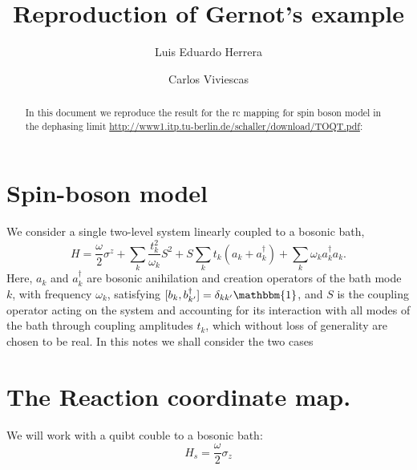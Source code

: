 \documentclass[reprint,aps,onecolumn,pra,notitlepage,nofootinbib]{revtex4-1}
\theoremstyle{definition}
\numberwithin{equation}{section}
\begin{document}
	\title[Caos]{Reproduction of Gernot's example}

    \author{Luis Eduardo Herrera}
\author{Carlos Viviescas}

\begin{abstract}
 In this document we reproduce the result for the rc mapping for spin boson model in the dephasing limit   \cite{schaller2020theorie} \url{http://www1.itp.tu-berlin.de/schaller/download/TOQT.pdf}:   
\end{abstract}
	
\maketitle
%

\section{Spin-boson model}

We consider a single two-level system linearly coupled to a bosonic bath, 
\begin{equation}
H=\frac{\omega}{2} \sigma^{z}+\sum_{k} \frac{t_{k}^{2}}{\omega_{k}} S^{2}+S \sum_{k} t_{k}\left(a_{k}+a_{k}^{\dagger}\right)+\sum_{k} \omega_{k} a_{k}^{\dagger} a_{k}.
\end{equation}
Here, $a_{k}$ and $a^{\dagger}_{k}$ are bosonic anihilation and creation operators of the bath mode $k$, with frequency $\omega_{k}$, satisfying $[b_{k},b^{\dagger}_{k'}] = \delta_{kk'} \mathbbm{1}$, and $S$ is the coupling operator acting on the system and accounting for its interaction with all modes of the bath through coupling amplitudes $t_{k}$, which without loss of generality are chosen to be real. In this notes we shall consider the two cases  





\section*{The Reaction coordinate map. }

We will work with a quibt couble to a bosonic bath:
\begin{equation}
 H_s= \frac{\omega}{2} \sigma_z    
\end{equation}
 
\end{document}
